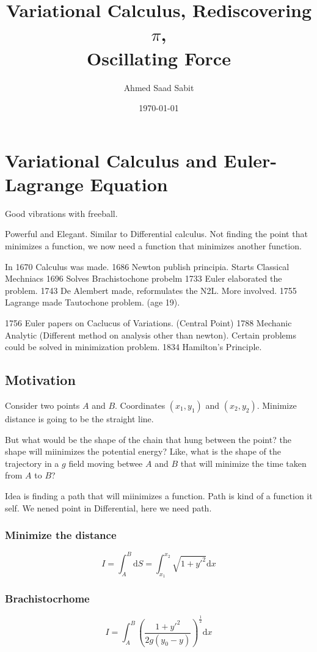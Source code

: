 \documentclass[a4paper, 11pt,twoside]{memoir}
\title{Variational Calculus, Rediscovering $\pi$, \\ Oscillating Force}
\author{Ahmed Saad Sabit}
\date{\today}
\begin{document}
\maketitle
\chapter{ Variational Calculus and Euler-Lagrange Equation }
   Good vibrations with freeball.


   Powerful and Elegant. Similar to Differential calculus. Not finding the point that minimizes a function, we now need a function that minimizes another function.

   In 1670 Calculus was made. 
   1686 Newton publish principia.
   Starts Classical Mechniacs
   1696 Solves Brachistochone probelm
   1733 Euler elaborated the problem. 
   1743 De Alembert made, reformulates the N2L. More involved.
   1755 Lagrange made Tautochone problem.
   (age 19).

        1756 Euler papers on Caclucus of Variations. (Central Point)
        1788 Mechanic Analytic (Different method on analysis other than newton). Certain problems could be solved in minimization problem.
        1834 Hamilton's Principle. 

        \section{Motivation}
        Consider two points $A$ and $B$. Coordinates $(x_1,y_1)$ and $(x_2,y_2)$. Minimize distance is going to be the straight line. 

        But what would be the shape of the chain that hung between the point? the shape will miinimizes the potential energy? Like, what is the shape of the trajectory in a $g$ field moving betwee $A$ and $B$ that will minimize the time taken from $A$ to $B$?

        Idea is finding a path that will miinimizes a function. Path is kind of a function it self. We nened point in Differential, here we need path. 

        \subsection{Minimize the distance}
        \[ 
        I = \int_{A}^{B} \mathrm{d} S = \int_{x_1}^{x_2}  \sqrt{1 + y'^2}  \mathrm{d}  x   
        \] 

        \subsection{Brachistocrhome}
        \[ 
            I = \int_{A}^{B} \left(  \frac{1 + y'^2}{2g (y_0 - y)} \right)^{\frac{1}{2}} \mathrm{d} x  
        \] 
\end{document}
